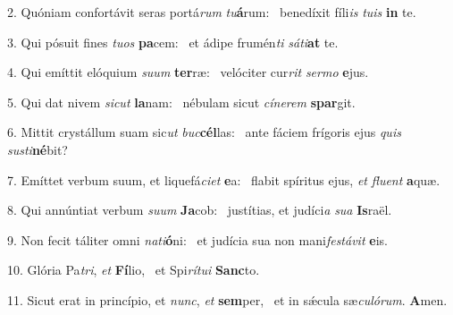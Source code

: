 2. Quóniam confortávit seras portá\textit{rum} \textit{tu}\textbf{á}rum: \ast\  benedíxit fíli\textit{is} \textit{tu}\textit{is} \textbf{in} te.\

3. Qui pósuit fines \textit{tu}\textit{os} \textbf{pa}cem: \ast\  et ádipe frumén\textit{ti} \textit{sá}\textit{ti}\textbf{at} te.\

4. Qui emíttit elóquium \textit{su}\textit{um} \textbf{ter}ræ: \ast\  velóciter cur\textit{rit} \textit{ser}\textit{mo} \textbf{e}jus.\

5. Qui dat nivem \textit{sic}\textit{ut} \textbf{la}nam: \ast\  nébulam sicut \textit{cí}\textit{ne}\textit{rem} \textbf{spar}git.\

6. Mittit crystállum suam sic\textit{ut} \textit{buc}\textbf{cél}las: \ast\  ante fáciem frígoris ejus \textit{quis} \textit{sus}\textit{ti}\textbf{né}bit?\

7. Emíttet verbum suum, et liquefá\textit{ci}\textit{et} \textbf{e}a: \ast\  flabit spíritus ejus, \textit{et} \textit{flu}\textit{ent} \textbf{a}quæ.\

8. Qui annúntiat verbum \textit{su}\textit{um} \textbf{Ja}cob: \ast\  justítias, et judíci\textit{a} \textit{su}\textit{a} \textbf{Is}raël.\

9. Non fecit táliter omni \textit{na}\textit{ti}\textbf{ó}ni: \ast\  et judícia sua non mani\textit{fes}\textit{tá}\textit{vit} \textbf{e}is.\

10. Glória Pa\textit{tri}, \textit{et} \textbf{Fí}lio, \ast\  et Spi\textit{rí}\textit{tu}\textit{i} \textbf{Sanc}to.\

11. Sicut erat in princípio, et \textit{nunc}, \textit{et} \textbf{sem}per, \ast\  et in sǽcula sæ\textit{cu}\textit{ló}\textit{rum}. \textbf{A}men.\

